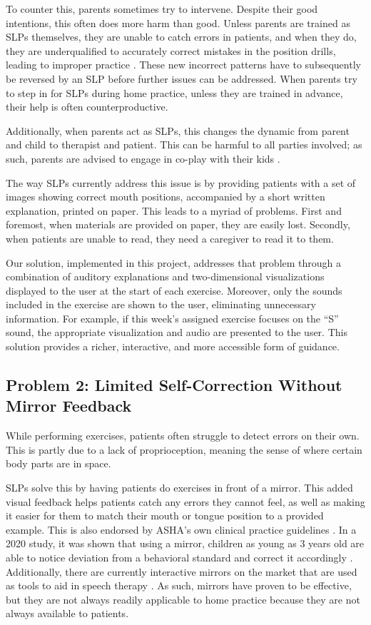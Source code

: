 To counter this, parents sometimes try to intervene. Despite their good intentions, this often does more harm than good. Unless parents are trained as SLPs themselves, they are unable to catch errors in patients, and when they do, they are underqualified to accurately correct mistakes in the position drills, leading to improper practice \cite{sugden2020multiple}. These new incorrect patterns have to subsequently be reversed by an SLP before further issues can be addressed. When parents try to step in for SLPs during home practice, unless they are trained in advance, their help is often counterproductive.

Additionally, when parents act as SLPs, this changes the dynamic from parent and child to therapist and patient. This can be harmful to all parties involved; as such, parents are advised to engage in co-play with their kids \cite{klatte2020collaboration}.

The way SLPs currently address this issue is by providing patients with a set of images showing correct mouth positions, accompanied by a short written explanation, printed on paper. This leads to a myriad of problems. First and foremost, when materials are provided on paper, they are easily lost. Secondly, when patients are unable to read, they need a caregiver to read it to them.

Our solution, implemented in this project, addresses that problem through a combination of auditory explanations and two-dimensional visualizations displayed to the user at the start of each exercise. Moreover, only the sounds included in the exercise are shown to the user, eliminating unnecessary information. For example, if this week's assigned exercise focuses on the ``S'' sound, the appropriate visualization and audio are presented to the user. This solution provides a richer, interactive, and more accessible form of guidance.

\subsection[Problem 2: Limited Self-Correction]{Problem 2: Limited Self-Correction Without Mirror Feedback}

While performing exercises, patients often struggle to detect errors on their own. This is partly due to a lack of proprioception, meaning the sense of where certain body parts are in space.

SLPs solve this by having patients do exercises in front of a mirror. This added visual feedback helps patients catch any errors they cannot feel, as well as making it easier for them to match their mouth or tongue position to a provided example. This is also endorsed by ASHA's own clinical practice guidelines \cite{asha_ssd_portal}. In a 2020 study, it was shown that using a mirror, children as young as 3 years old are able to notice deviation from a behavioral standard and correct it accordingly \cite{martin2020mirror}. Additionally, there are currently interactive mirrors on the market that are used as tools to aid in speech therapy \cite{briolight2021mirror}. As such, mirrors have proven to be effective, but they are not always readily applicable to home practice because they are not always available to patients.

